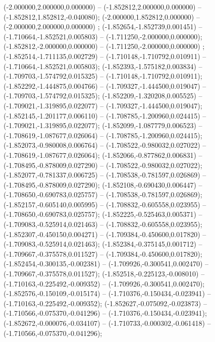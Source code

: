  (-2.000000,2.000000,0.000000) -- (-1.852812,2.000000,0.000000) -- (-1.852812,1.852812,-0.040080);
 (-2.000000,1.852812,0.000000) -- (-2.000000,2.000000,0.000000) ;
 (-1.852654,-1.852739,0.001451) -- (-1.710664,-1.852521,0.005803) -- (-1.711250,-2.000000,0.000000);
 (-1.852812,-2.000000,0.000000) -- (-1.711250,-2.000000,0.000000) ;
 (-1.852514,-1.711135,0.002729) -- (-1.710148,-1.710792,0.010911) -- (-1.710664,-1.852521,0.005803);
 (-1.852393,-1.575182,0.003834) -- (-1.709703,-1.574792,0.015325) -- (-1.710148,-1.710792,0.010911);
 (-1.852292,-1.444875,0.004766) -- (-1.709327,-1.444500,0.019047) -- (-1.709703,-1.574792,0.015325);
 (-1.852209,-1.320208,0.005525) -- (-1.709021,-1.319895,0.022077) -- (-1.709327,-1.444500,0.019047);
 (-1.852145,-1.201177,0.006110) -- (-1.708785,-1.200960,0.024415) -- (-1.709021,-1.319895,0.022077);
 (-1.852099,-1.087779,0.006523) -- (-1.708619,-1.087677,0.026064) -- (-1.708785,-1.200960,0.024415);
 (-1.852073,-0.980008,0.006764) -- (-1.708522,-0.980032,0.027022) -- (-1.708619,-1.087677,0.026064);
 (-1.852066,-0.877862,0.006831) -- (-1.708495,-0.878009,0.027290) -- (-1.708522,-0.980032,0.027022);
 (-1.852077,-0.781337,0.006725) -- (-1.708538,-0.781597,0.026869) -- (-1.708495,-0.878009,0.027290);
 (-1.852108,-0.690430,0.006447) -- (-1.708650,-0.690783,0.025757) -- (-1.708538,-0.781597,0.026869);
 (-1.852157,-0.605140,0.005995) -- (-1.708832,-0.605558,0.023955) -- (-1.708650,-0.690783,0.025757);
 (-1.852225,-0.525463,0.005371) -- (-1.709083,-0.525914,0.021463) -- (-1.708832,-0.605558,0.023955);
 (-1.852307,-0.450150,0.004271) -- (-1.709384,-0.450600,0.017820) -- (-1.709083,-0.525914,0.021463);
 (-1.852384,-0.375145,0.001712) -- (-1.709667,-0.375578,0.011527) -- (-1.709384,-0.450600,0.017820);
 (-1.852454,-0.300135,-0.002381) -- (-1.709926,-0.300541,0.002470) -- (-1.709667,-0.375578,0.011527);
 (-1.852518,-0.225123,-0.008010) -- (-1.710163,-0.225492,-0.009352) -- (-1.709926,-0.300541,0.002470);
 (-1.852576,-0.150109,-0.015174) -- (-1.710376,-0.150434,-0.023941) -- (-1.710163,-0.225492,-0.009352);
 (-1.852627,-0.075092,-0.023873) -- (-1.710566,-0.075370,-0.041296) -- (-1.710376,-0.150434,-0.023941);
 (-1.852672,-0.000076,-0.034107) -- (-1.710733,-0.000302,-0.061418) -- (-1.710566,-0.075370,-0.041296);
